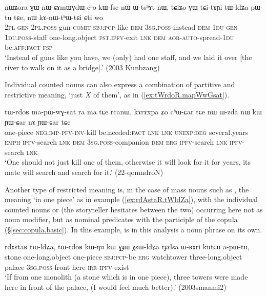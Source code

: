 \begin{exe}
	\ex \label{ex:tAYi.tWldZa}
	\gll nɯʑora ɣɯ nɯ-ɕɤmɯɣdɯ cʰo kɯ-fse nɯ ɯ-tsʰɤt nɯ, tɕiʑo ɣɯ tɕi-tɤɲi tɯ-ldʑa pɯ-tu tɕe, nɯ kɤ-nɯ-tʰɯ-tɕi ɕti wo \\
	\textsc{2pl} \textsc{gen} \textsc{2pl}.\textsc{poss}-gun \textsc{comit} \textsc{sbj}:\textsc{pcp}-like \textsc{dem} \textsc{3sg}.\textsc{poss}-instead \textsc{dem}  \textsc{1du} \textsc{gen} \textsc{1du}.\textsc{poss}-staff one-long.object \textsc{pst}.\textsc{ipfv}-exit \textsc{lnk} \textsc{dem} \textsc{aor}-\textsc{auto}-spread-\textsc{1du} be.\textsc{aff}:\textsc{fact} \textsc{fsp} \\
	\glt `Instead of guns like you have, we (only) had one staff, and we laid it over [the river to walk on it as a bridge].' (2003 Kunbzang)
\end{exe} 

Individual counted nouns can also express a combination of partitive and restrictive meaning, `just $X$ of them', as in (\ref{ex:tWrdoR.mapWwGsat}).

\begin{exe}
	\ex \label{ex:tWrdoR.mapWwGsat}
	\gll 
	tɯ-rdoʁ ma-pɯ́-wɣ-sat ra ma tɕe rcanɯ, kɤrɤxpa ʑo cʰɯ-ɕar tɕe nɯ ɯ-zda nɯ kɯ ɲɯ-ɕar nɤ ɲɯ-ɕar tɕe \\
	one-piece \textsc{neg}.\textsc{imp}-\textsc{pfv}-\textsc{inv}-kill be.needed:\textsc{fact} \textsc{lnk} \textsc{lnk} \textsc{unexp}:\textsc{deg} several.years \textsc{emph} \textsc{ipfv}-search \textsc{lnk} \textsc{dem} \textsc{3sg}.\textsc{poss}-companion \textsc{dem} \textsc{erg} \textsc{ipfv}-search \textsc{lnk} \textsc{ipfv}-search \textsc{lnk} \\
	\glt `One should not just kill one of them, otherwise it will look for it for years, its mate will search and search for it.' (22-qomndroN)
\end{exe}

Another type of restricted meaning is, in the case of mass nouns such as , the meaning `in one piece' as in example (\ref{ex:rdAstaR.tWldZa}), with the individual counted nouns  or  (the storyteller hesitates between the two) occurring here not as noun modifier, but as nominal predicates with the participle of the copula  (§\ref{sec:copula.basic}). In this example,  is in this analysis a noun phrase on its own.

\begin{exe}
	\ex \label{ex:rdAstaR.tWldZa}
	\gll rdɤstaʁ tɯ-ldʑa, tɯ-rdoʁ kɯ-ŋu kɯ ɣɟɯ χsɯ-ldʑa rɟɤlsa ɯ-ʁɤri kutɕu a-pɯ-tu, \\
	stone one-long.object one-piece \textsc{sbj}:\textsc{pcp}-be \textsc{erg} watchtower three-long.object palace \textsc{3sg}.\textsc{poss}-front here \textsc{irr}-\textsc{ipfv}-exist \\
	\glt `If from one monolith (a stone which is in one piece), three  towers were made here in front of the palace, (I would feel much better).'  (2003smanmi2)
\end{exe} 

